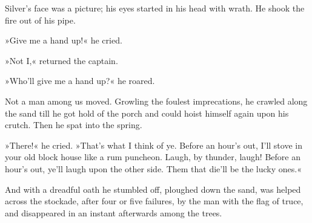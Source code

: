 Silver's face was a picture; his eyes started in his head with wrath. He shook the fire out of his pipe.

»Give me a hand up!« he cried.

»Not I,« returned the captain.

»Who'll give me a hand up?« he roared.

Not a man among us moved. Growling the foulest imprecations, he crawled along the sand till he got hold of the porch and could hoist himself again upon his crutch. Then he spat into the spring.

»There!« he cried. »That's what I think of ye. Before an hour's out, I'll stove in your old block house like a rum puncheon. Laugh, by thunder, laugh! Before an hour's out, ye'll laugh upon the other side. Them that die'll be the lucky ones.«

And with a dreadful oath he stumbled off, ploughed down the sand, was helped across the stockade, after four or five failures, by the man with the flag of truce, and disappeared in an instant afterwards among the trees.
